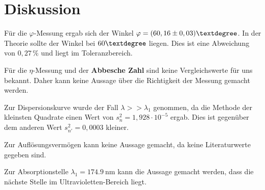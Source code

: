 \section{Diskussion}
Für die $\varphi$-Messung ergab sich der Winkel $\varphi = (60,16\pm0,03)\textdegree$.
In der Theorie sollte der Winkel bei $60 \textdegree$ liegen. Dies ist eine Abweichung
von $0,27 \, \%$ und liegt im Toleranzbereich.\newline

Für die $\eta$-Messung und der \textbf{Abbesche Zahl} sind keine Vergleichswerte
für uns bekannt. Daher kann keine Aussage über die Richtigkeit der Messung gemacht werden.\newline

Zur Dispersionskurve wurde der Fall $\lambda >> \lambda_1$ genommen, da die
Methode der kleinsten Quadrate einen Wert von $s^2_{n} = 1,928 \cdot 10^{-5}$ ergab. Dies
ist gegenüber dem anderen Wert $s^2_{n'} = 0,0003$ kleiner.\newline

Zur Auflösungsvermögen kann keine Aussage gemacht, da keine Literaturwerte gegeben sind.

Zur Absorptionstelle $\lambda_1 = \SI{174,9}{\nano\meter}$ kann die Aussage gemacht werden, dass die
nächste Stelle im Ultravioletten-Bereich\cite{2} liegt.

